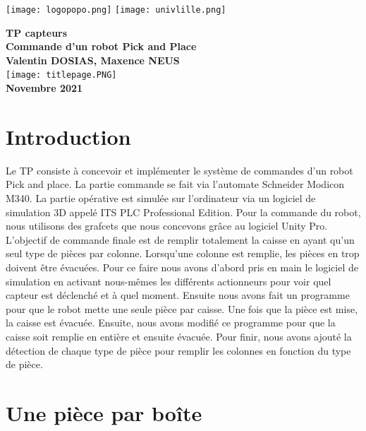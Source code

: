 \documentclass[oneside,a4paper,12pt]{article}
\begin{document}
	\begin{titlepage}
		\texttt{[image: logopopo.png]}
		\hspace*{\fill}
		\texttt{[image: univlille.png]}
		
		\begin{center}
			\vspace{1cm}
			\textbf{TP capteurs}\\
			\textbf{Commande d'un robot Pick and Place}\\
			\vspace{1cm}
			\textbf{Valentin DOSIAS, Maxence NEUS}\\
			\vspace{3cm}
			\texttt{[image: titlepage.PNG]}\\
			\vspace{\fill}
			\textbf{Novembre 2021}\\
		\end{center}
	\end{titlepage}
	
	\tableofcontents
	\newpage
	
	\section{Introduction}
	
	Le TP consiste à concevoir et implémenter le système de commandes d’un robot Pick and place. La partie commande se fait via l’automate Schneider Modicon M340. La partie opérative est simulée sur l’ordinateur via un logiciel de simulation 3D appelé ITS PLC Professional Edition. Pour la commande du robot, nous utilisons des grafcets que nous concevons grâce au logiciel Unity Pro.  L’objectif de commande finale est de remplir totalement la caisse en ayant qu’un seul type de pièces par colonne. Lorsqu’une colonne est remplie, les pièces en trop doivent être évacuées. Pour ce faire nous avons d’abord pris en main le logiciel de simulation en activant nous-mêmes les différents actionneurs pour voir quel capteur est déclenché et à quel moment. Ensuite nous avons fait un programme pour que le robot mette une seule pièce par caisse. Une fois que la pièce est mise, la caisse est évacuée. Ensuite, nous avons modifié ce programme pour que la caisse soit remplie en entière et ensuite évacuée. Pour finir, nous avons ajouté la détection de chaque type de pièce pour remplir les colonnes en fonction du type de pièce.
	\newpage
	
	\section{Une pièce par boîte}
	
\end{document}
